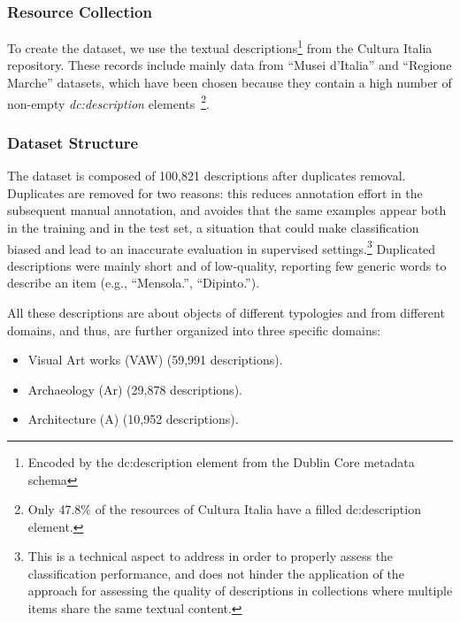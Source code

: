\documentclass[epsfig,a4paper,12pt,titlepage]{book}
\begin{document}
\subsubsection{Resource Collection}
To create the dataset, we use the textual descriptions\footnote{Encoded by the dc:description element from the Dublin Core metadata schema} from the Cultura Italia repository. These records include mainly data from ``Musei d'Italia'' and ``Regione Marche'' datasets, which have been chosen because they contain a high number of non-empty \textit{dc:description} elements~\footnote{Only 47.8\% of the resources of Cultura Italia have a filled dc:description element. }.
\subsubsection{Dataset Structure}

The dataset is composed of 100,821 descriptions after duplicates removal. Duplicates are removed for two reasons: this reduces annotation effort in the subsequent manual annotation, and avoides that the same examples appear both in the training and in the test set, a situation that could make classification biased and lead to an inaccurate evaluation in supervised settings.\footnote{This is a technical aspect to address in order to properly assess the classification performance, and does not hinder the application of the approach for assessing the quality of descriptions in collections where multiple items share the same textual content.} Duplicated descriptions were mainly short and of low-quality, reporting few generic words to describe an item (e.g., ``Mensola.'', ``Dipinto.'').

All these descriptions are about objects of different typologies and from different domains, and thus, are further organized into three specific domains: 
\begin{itemize}
    \item Visual Art works (VAW) (59,991 descriptions).
    \item Archaeology (Ar) (29,878 descriptions).
    \item Architecture (A) (10,952 descriptions).
\end{itemize}
\end{document}
